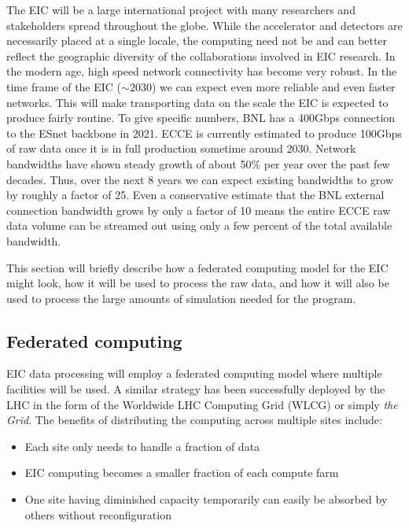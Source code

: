 

The EIC will be a large international project with many researchers and stakeholders spread throughout the globe. While the accelerator and detectors are necessarily placed at a single locale, the computing need not be and can better reflect the geographic diversity of the collaborations involved in EIC research. In the modern age, high speed network connectivity has become very robust. In the time frame of the EIC ($\sim 2030$) we can expect even more reliable and even faster networks. This will make transporting data on the scale the EIC is expected to produce fairly routine. To give specific numbers, BNL has a 400Gbps connection to the ESnet backbone in 2021. ECCE is currently estimated to produce 100Gbps of raw data once it is in full production sometime around 2030. Network bandwidths have shown steady growth of about 50\% per year over the past few decades\cite{nielsensLaw2019}. Thus, over the next 8 years we can expect existing bandwidths to grow by roughly a factor of 25. Even a conservative estimate that the BNL external connection bandwidth grows by only a factor of 10 means the entire ECCE raw data volume can be streamed out using only a few percent of the total available bandwidth.

This section will briefly describe how a federated computing model for the EIC might look, how it will be used to process the raw data, and how it will also be used to process the large amounts of simulation needed for the program.

\subsection{Federated computing}

EIC data processing will employ a federated computing model where multiple facilities will be used. A similar strategy has been successfully deployed by the LHC in the form of the Worldwide LHC Computing Grid (WLCG) or simply \emph{the Grid}\cite{SHIERS2007219}. The benefits of distributing the computing across multiple sites include:

\begin{itemize}
    \item Each site only needs to handle a fraction of data
    \item EIC computing becomes a smaller fraction of each compute farm
    \item One site having diminished capacity temporarily can easily be absorbed by others without reconfiguration
\end{itemize}

